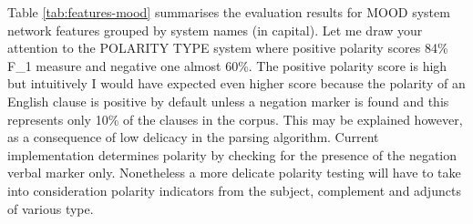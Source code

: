 
Table \ref{tab:features-mood} summarises the evaluation results for MOOD system network features grouped by system names (in capital). Let me draw your attention to the POLARITY TYPE system where positive polarity scores 84\% F_1 measure and negative one almost 60\%. The positive polarity score is high but intuitively I would have expected even higher score because the polarity of an English clause is positive by default unless a negation marker is found and this represents only 10\% of the clauses in  the corpus. This may be explained however, as a consequence of low delicacy in the parsing algorithm. Current implementation determines polarity by checking for the presence of the negation verbal marker only. Nonetheless a more delicate polarity testing will have to take into consideration polarity indicators from the subject, complement and adjuncts of various type. 

